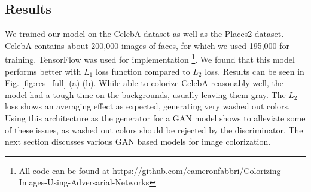 \documentclass[10pt]{article}
\begin{document}
\subsection{\textbf{Results}}
We trained our model on the CelebA dataset \cite{celebA} as well as the Places2 \cite{places2} dataset. CelebA contains about 200,000 images of faces, for which we used 195,000 for training.
TensorFlow \cite{abadi2016tensorflow} was used for implementation \footnote{All code can be found at https://github.com/cameronfabbri/Colorizing-Images-Using-Adversarial-Networks}.
We found that this model performs better with $L_1$ loss function compared to $L_2$ loss. Results can be seen in Fig. \ref{fig:res_full} (a)-(b). %
While able to colorize CelebA reasonably well, the model had a tough time on the backgrounds, usually leaving them gray. The $L_2$ loss shows an averaging effect as expected, generating very washed out colors.
Using this architecture as the generator for a GAN model shows to alleviate some of these issues, as washed out colors should be rejected by the discriminator. The next section discusses various GAN based models for image
colorization.


 
\end{document}

